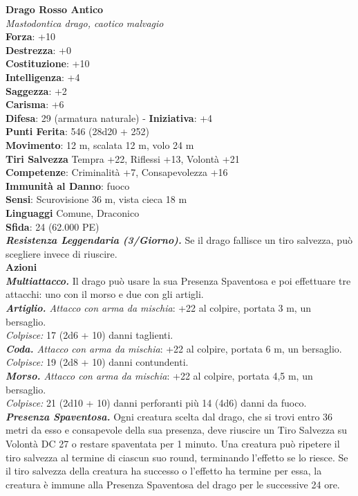 \begin{multicols}{2}
\medskip\textbf{Drago Rosso Antico}\\
\emph{Mastodontica drago, caotico malvagio}\\
\textbf{Forza}: +10\\
\textbf{Destrezza}: +0\\
\textbf{Costituzione}: +10\\
\textbf{Intelligenza}: +4\\
\textbf{Saggezza}: +2\\
\textbf{Carisma}: +6\\
\textbf{Difesa}: 29 (armatura naturale) - \textbf{Iniziativa}: +4\\
\textbf{Punti Ferita}: 546 (28d20 + 252)\\
\textbf{Movimento}: 12 m, scalata 12 m, volo 24 m\\
\textbf{Tiri Salvezza} Tempra +22, Riflessi +13, Volontà +21\\
\textbf{Competenze}: Criminalità +7, Consapevolezza +16\\
\textbf{Immunità al Danno}: fuoco\\
\textbf{Sensi}: Scurovisione 36 m, vista cieca 18 m\\
\textbf{Linguaggi} Comune, Draconico\\
\textbf{Sfida}: 24 (62.000 PE)\smallskip\\
\emph{\textbf{Resistenza Leggendaria (3/Giorno).}} Se il drago fallisce un tiro salvezza, può scegliere invece di riuscire.\\
\smallskip\textbf{Azioni}\\
\emph{\textbf{Multiattacco.}} Il drago può usare la sua Presenza Spaventosa e poi effettuare tre attacchi: uno con il morso e due con gli artigli.\\
\emph{\textbf{Artiglio.} Attacco con arma da mischia}: +22 al colpire, portata 3 m, un bersaglio.\\
\emph{Colpisce:} 17 (2d6 + 10) danni taglienti.\\
\emph{\textbf{Coda.} Attacco con arma da mischia}: +22 al colpire, portata 6 m, un bersaglio.\\
\emph{Colpisce:} 19 (2d8 + 10) danni contundenti.\\
\emph{\textbf{Morso.} Attacco con arma da mischia}: +22 al colpire, portata 4,5 m, un bersaglio.\\
\emph{Colpisce:} 21 (2d10 + 10) danni perforanti più 14 (4d6) danni da fuoco.\\
\emph{\textbf{Presenza Spaventosa.}} Ogni creatura scelta dal drago, che si trovi entro 36 metri da esso e consapevole della sua presenza, deve riuscire un Tiro Salvezza su Volontà DC  27 o restare spaventata per 1 minuto. Una creatura può ripetere il tiro salvezza al termine di ciascun suo round, terminando l'effetto se lo riesce. Se il tiro salvezza della creatura ha successo o l'effetto ha termine per essa, la creatura è immune alla Presenza Spaventosa del drago per le successive 24 ore.\\

\end{multicols}
